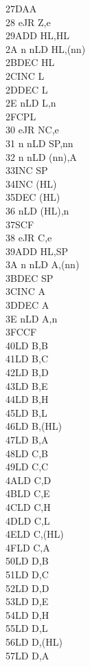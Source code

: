 \documentclass[oneside,a4paper]{book}
\begin{document}
\begin{multicols}{3}
{\begin{tabbing}
27\>DAA\\
28 e\>JR Z,e\\
29\>ADD HL,HL\\
2A n n\>LD HL,(nn)\\
2B\>DEC HL\\
2C\>INC L\\
2D\>DEC L\\
2E n\>LD L,n\\
2F\>CPL\\
30 e\>JR NC,e\\
31 n n\>LD SP,nn\\
32 n n\>LD (nn),A\\
33\>INC SP\\
34\>INC (HL)\\
35\>DEC (HL)\\
36 n\>LD (HL),n\\
37\>SCF\\
38 e\>JR C,e\\
39\>ADD HL,SP\\
3A n n\>LD A,(nn)\\
3B\>DEC SP\\
3C\>INC A\\
3D\>DEC A\\
3E n\>LD A,n\\
3F\>CCF\\
40\>LD B,B\\
41\>LD B,C\\
42\>LD B,D\\
43\>LD B,E\\
44\>LD B,H\\
45\>LD B,L\\
46\>LD B,(HL)\\
47\>LD B,A\\
48\>LD C,B\\
49\>LD C,C\\
4A\>LD C,D\\
4B\>LD C,E\\
4C\>LD C,H\\
4D\>LD C,L\\
4E\>LD C,(HL)\\
4F\>LD C,A\\
50\>LD D,B\\
51\>LD D,C\\
52\>LD D,D\\
53\>LD D,E\\
54\>LD D,H\\
55\>LD D,L\\
56\>LD D,(HL)\\
57\>LD D,A\\

\end{tabbing}}
\end{multicols}
\end{document}
